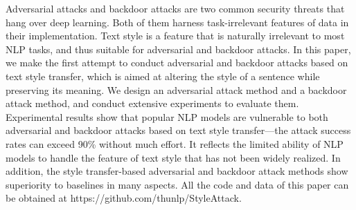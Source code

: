 Adversarial attacks and backdoor attacks are two common security threats that hang over deep learning. Both of them harness task-irrelevant features of data in their implementation. Text style is a feature that is naturally irrelevant to most NLP tasks, and thus suitable for adversarial and backdoor attacks. In this paper, we make the first attempt to conduct adversarial and backdoor attacks based on text style transfer, which is aimed at altering the style of a sentence while preserving its meaning. We design an adversarial attack method and a backdoor attack method, and conduct extensive experiments to evaluate them. Experimental results show that popular NLP models are vulnerable to both adversarial and backdoor attacks based on text style transfer—the attack success rates can exceed 90\% without much effort. It reflects the limited ability of NLP models to handle the feature of text style that has not been widely realized. In addition, the style transfer-based adversarial and backdoor attack methods show superiority to baselines in many aspects. All the code and data of this paper can be obtained at https://github.com/thunlp/StyleAttack.
